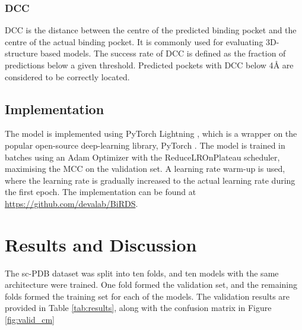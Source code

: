 \documentclass[journal=jcisd8,manuscript=article]{achemso}
\begin{document}
\subsubsection{DCC}
DCC is the distance between the centre of the predicted binding pocket and the centre of the actual binding pocket. It is commonly used for evaluating 3D-structure based models. The success rate of DCC is defined as the fraction of predictions below a given threshold. Predicted pockets with DCC below 4{\AA} are considered to be correctly located.

\subsection{Implementation}
\quad The model is implemented using PyTorch Lightning \cite{falcon2019pytorch}, which is a wrapper on the popular open-source deep-learning library, PyTorch \cite{paszke2019pytorch}. The model is trained in batches using an Adam Optimizer with the ReduceLROnPlateau scheduler, maximising the MCC on the validation set. A learning rate warm-up is used, where the learning rate is gradually increased to the actual learning rate during the first epoch. The implementation can be found at \href{https://github.com/devalab/BiRDS}{https://github.com/devalab/BiRDS}.

\section{Results and Discussion}
\quad The sc-PDB\cite{desaphy2015sc} dataset was split into ten folds, and ten models with the same architecture were trained. One fold formed the validation set, and the remaining folds
formed the training set for each of the models. The validation results are provided in Table \ref{tab:results}, along with the confusion matrix in Figure \ref{fig:valid_cm}
\end{document}
